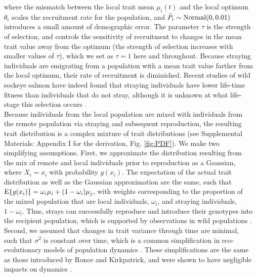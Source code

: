 \documentclass{revtex4}
\begin{document}
\noindent where the mismatch between the local trait mean $\mu_i(t)$ and the local optimum $\theta_i$ scales the recruitment rate for the population, and $\tilde{P}_i\sim {\rm Normal}(0,0.01)$ introduces a small amount of demographic error.
The parameter $\tau$ is the strength of selection, and controls the sensitivity of recruitment to changes in the mean trait value away from the optimum (the strength of selection increases with smaller values of $\tau$), which we set as $\tau=1$ here and throughout.
Because straying individuals are emigrating from a population with a mean trait value farther from the local optimum, their rate of recruitment is diminished.
Recent studies of wild sockeye salmon have indeed found that straying individuals have lower life-time fitness than individuals that do not stray, although it is unknown at what life-stage this selection occurs \citep{Peterson:2014gy}.
\\


Because individuals from the local population are mixed with individuals from the remote population via straying and subsequent reproduction, the resulting trait distribution is a complex mixture of trait distributions (see Supplemental Materials: Appendix I for the derivation, Fig. \ref{fig:PDF}).
We make two simplifying assumptions.
First, we approximate the distribution resulting from the mix of remote and local individuals prior to reproduction as a Gaussian, where $X_i=x_i$ with probability $g(x_i)$.
The expectation of the actual trait distribution as well as the Gaussian approximation are the same, such that ${\rm E}\{g(x_i)\} = \omega_i\mu_i + (1-\omega_i)\mu_j$, with weights corresponding to the proportion of the mixed population that are local individuals, $\omega_i$, and straying individuals, $1-\omega_i$.
Thus, strays can successfully reproduce and introduce their genotypes into the recipient population, which is supported by observations in wild populations \citep{Jasper:2013cc}.
Second, we assumed that changes in trait variance through time are minimal, such that $\sigma^2$ is constant over time, which is a common simplification in eco-evolutionary models of population dynamics \citep{Lande:1976ga,Ronce:2001dp,Schreiber:2011wx,Gilbert:2014ee,Gibert:2015kc}.
These simplifications are the same as those introduced by Ronce and Kirkpatrick, and were shown to have negligible impacts on dynamics \cite{Ronce:2001dp}.
\end{document}
